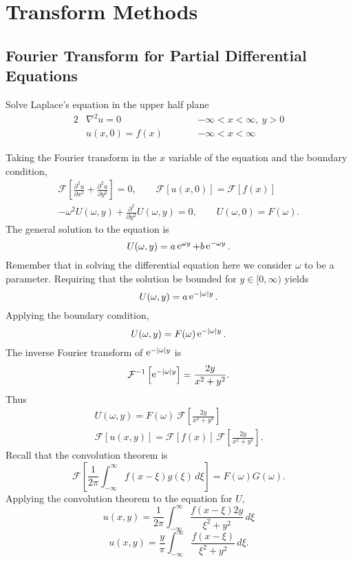 \flushbottom




\chapter{Transform Methods}





\section{Fourier Transform for Partial Differential Equations}
Solve Laplace's equation in the upper half plane
\begin{alignat*}{2}
  &\nabla^2 u = 0 &\qquad
  & -\infty < x < \infty,\ y > 0 \\
  &u(x,0) = f(x) &\qquad
  &-\infty < x < \infty
\end{alignat*}

Taking the Fourier transform in the $x$ variable of the equation and the
boundary condition,
\begin{gather*}
  \mathcal{F}\left[ \frac{\partial^2 u}{\partial x^2} + \frac{\partial^2 u}{\partial y^2} \right] = 0, \qquad
  \mathcal{F}\left[u(x,0)\right] = \mathcal{F}\left[f(x)\right] \\
  -\omega^2 U(\omega,y) + \frac{\partial^2}{\partial y^2} U(\omega,y) = 0, \qquad
  U(\omega,0) = F(\omega).
\end{gather*}
The general solution to the equation is
\[U(\omega,y) = a \mathop{\mathrm{e}}\nolimits^{\omega y} + b \mathop{\mathrm{e}}\nolimits^{-\omega y}. \]
Remember that in solving the differential equation here we consider
$\omega$ to be a parameter.
Requiring that the solution be bounded for $y \in [0,\infty)$ yields
\[ U(\omega,y) = a \mathop{\mathrm{e}}\nolimits^{-|\omega| y}. \]
Applying the boundary condition,
\[U(\omega, y) = F(\omega) \mathop{\mathrm{e}}\nolimits^{-|\omega|y}. \]
The inverse Fourier transform of $\mathop{\mathrm{e}}\nolimits^{-|\omega|y}$ is
\[ \mathcal{F}^{-1}\left[\mathop{\mathrm{e}}\nolimits^{-|\omega|y}\right] = \frac{2 y}{x^2 + y^2}. \]
Thus
\begin{gather*}
  U(\omega, y) = F(\omega)\  \mathcal{F}\left[\frac{2 y}{x^2 + y^2}
  \right] \\
  \mathcal{F}\left[u(x,y)\right] =  \mathcal{F}\left[f(x)\right]
  \ \mathcal{F}\left[\frac{2 y}{x^2 + y^2} \right].
\end{gather*}
Recall that the convolution theorem is
\[ \mathcal{F}\left[ \frac{1}{2\pi}
  \int_{-\infty}^\infty f(x-\xi) g(\xi)\,d\xi\right] =
F(\omega)G(\omega). \]
Applying the convolution theorem to the equation for $U$,
\[ u(x,y) = \frac{1}{2\pi} \int_{-\infty}^\infty \frac{f(x-\xi) 2y}
{\xi^2 + y^2} \,d\xi \]
\[\boxed{u(x,y) = \frac{y}{\pi} \int_{-\infty}^\infty
  \frac{f(x-\xi)}{\xi^2 + y^2}\,d\xi.}\]









